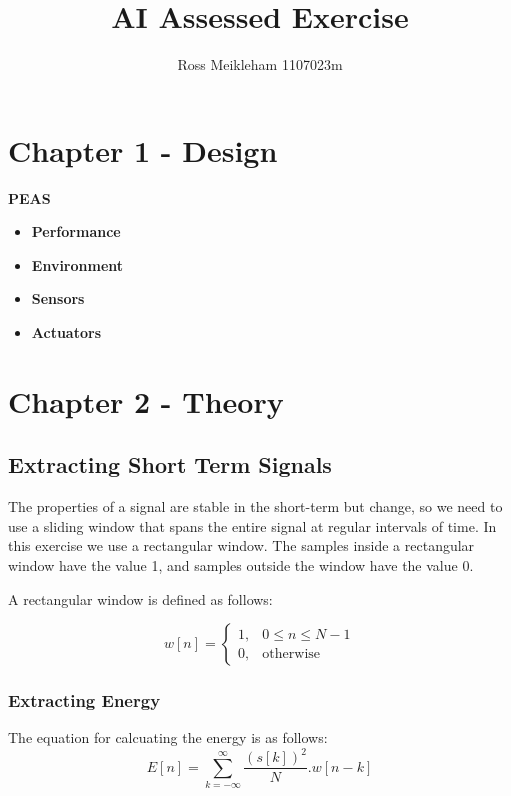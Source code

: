 \documentclass[a4paper]{article}
\begin{document}
\title{AI Assessed Exercise}

\author{Ross Meikleham 1107023m}

\maketitle


\section{Chapter 1 - Design}


\textbf{PEAS}
\begin{itemize}
\item \textbf{Performance} 
\item \textbf{Environment} 
\item \textbf{Sensors} 
\item \textbf{Actuators} 
\end{itemize}


\section{Chapter 2 - Theory}


\subsection{Extracting Short Term Signals} \label{sec:extract}

The properties of a signal are stable in the short-term but change, so we need
to use a sliding window that spans the entire signal at regular intervals of time.
In this exercise we use a rectangular window. The samples inside a rectangular window
have the value 1, and samples outside the window have the value 0.

A rectangular window is defined as follows: 

\begin{equation}
w[n] =
    \begin{cases}
        1, & 0 \leq n \leq N-1\\
        0, & \text{otherwise}
    \end{cases}
\end{equation}


\subsubsection{Extracting Energy} \label{sec:energy}

The equation for calcuating the energy is as follows:
\begin{equation}
 E[n] = \sum_{k=-\infty}^{\infty}\frac{(s[k])^2}{N}.w[n-k]
\end{equation}
\end{document}
